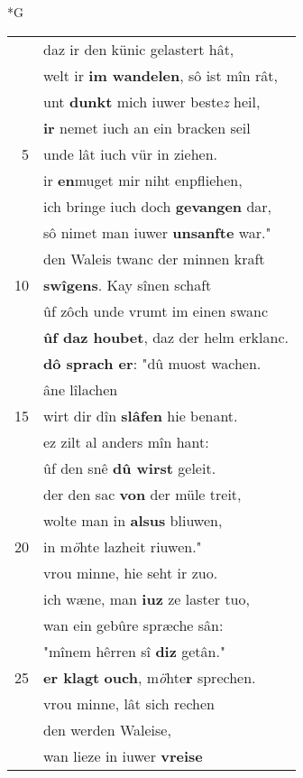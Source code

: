 \documentclass[8pt,a4paper,notitlepage]{article}
\begin{document}
\newpage
\begin{table}[ht]
\begin{minipage}[t]{0.5\linewidth}
\small
\begin{center}*G
\end{center}
\begin{tabular}{rl}
 & daz ir den künic gelastert hât,\\ 
 & welt ir \textbf{im wandelen}, sô ist mîn rât,\\ 
 & unt \textbf{dunkt} mich iuwer beste\textit{z} heil,\\ 
 & \textbf{ir} nemet iuch an ein bracken seil\\ 
5 & unde lât iuch vür in ziehen.\\ 
 & ir \textbf{en}muget mir niht enpfliehen,\\ 
 & ich bringe iuch doch \textbf{gevangen} dar,\\ 
 & sô nimet man iuwer \textbf{unsanfte} war."\\ 
 & den Waleis twanc der minnen kraft\\ 
10 & \textbf{swîgens}. Kay sînen schaft\\ 
 & ûf zôch unde vrumt im einen swanc\\ 
 & \textbf{ûf daz houbet}, daz der helm erklanc.\\ 
 & \textbf{dô sprach er}: "dû muost wachen.\\ 
 & âne lîlachen\\ 
15 & wirt dir dîn \textbf{slâfen} hie benant.\\ 
 & ez zilt al anders mîn hant:\\ 
 & ûf den snê \textbf{dû wirst} geleit.\\ 
 & der den sac \textbf{von} der müle treit,\\ 
 & wolte man in \textbf{alsus} bliuwen,\\ 
20 & in m\textit{ö}hte lazheit riuwen."\\ 
 & vrou minne, hie seht ir zuo.\\ 
 & ich wæne, man \textbf{iuz} ze laster tuo,\\ 
 & wan ein gebûre spræche sân:\\ 
 & "mînem hêrren sî \textbf{diz} getân."\\ 
25 & \textbf{er klagt} \textbf{ouch}, m\textit{ö}hte\textbf{r} sprechen.\\ 
 & vrou minne, lât sich rechen\\ 
 & den werden Waleise,\\ 
 & wan lieze in iuwer \textbf{vreise}\\ 

\end{tabular}
\end{minipage}
\end{table}
\end{document}
